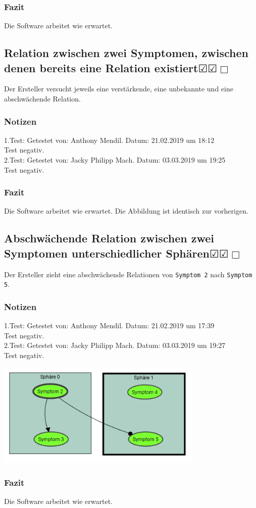\documentclass[enabledeprecatedfontcommands]{scrartcl}
\newcommand{\subsectiont}[2]{\subsection[#1]{#1{\normalsize\normalfont #2}}}
\newcommand{\leer}{$\Box$}
\newcommand{\ok}{$\CheckedBox$}
\begin{document}
\subsubsection{Fazit}
Die Software arbeitet wie erwartet.

\subsectiont{Relation zwischen zwei Symptomen, zwischen denen bereits eine Relation existiert}{\dotfill\ok\ok\leer}
Der Ersteller versucht jeweils eine verstärkende, eine unbekannte und eine abschwächende Relation.
\subsubsection{Notizen}
1.Test: Getestet von: Anthony Mendil. Datum: 21.02.2019 um 18:12 \\
Test negativ.\\
2.Test: Getestet von: Jacky Philipp Mach. Datum: 03.03.2019 um 19:25 \\
Test negativ.
\subsubsection{Fazit}
Die Software arbeitet wie erwartet. Die Abbildung ist identisch zur vorherigen.

\subsectiont{Abschwächende Relation zwischen zwei Symptomen unterschiedlicher Sphären}{\dotfill\ok\ok\leer}
Der Ersteller zieht eine abschwächende Relationen von \texttt{Symptom 2} nach \texttt{Symptom 5}. 
\subsubsection{Notizen}
1.Test: Getestet von: Anthony Mendil. Datum: 21.02.2019 um 17:39 \\
Test negativ.\\
2.Test: Getestet von: Jacky Philipp Mach. Datum: 03.03.2019 um 19:27 \\
Test negativ.
\begin{center}
\includegraphics[height=5cm]{1_10.PNG}
\end{center}
\subsubsection{Fazit}
Die Software arbeitet wie erwartet.
\end{document}
